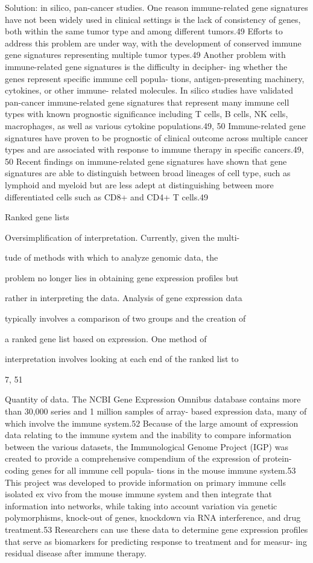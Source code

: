 \documentclass[12pt,]{book}
\theoremstyle{definition}
\theoremstyle{definition}
\theoremstyle{definition}
\theoremstyle{remark}
\begin{document}
Solution: in silico, pan-cancer studies. One reason immune-related gene
signatures have not been widely used in clinical settings is the lack of
consistency of genes, both within the same tumor type and among
different tumors.49 Efforts to address this problem are under way, with
the development of conserved immune gene signatures representing
multiple tumor types.49 Another problem with immune-related gene
signatures is the difficulty in decipher- ing whether the genes
represent specific immune cell popula- tions, antigen-presenting
machinery, cytokines, or other immune- related molecules. In silico
studies have validated pan-cancer immune-related gene signatures that
represent many immune cell types with known prognostic significance
including T cells, B cells, NK cells, macrophages, as well as various
cytokine populations.49, 50 Immune-related gene signatures have proven
to be prognostic of clinical outcome across multiple cancer types and
are associated with response to immune therapy in specific cancers.49,
50 Recent findings on immune-related gene signatures have shown that
gene signatures are able to distinguish between broad lineages of cell
type, such as lymphoid and myeloid but are less adept at distinguishing
between more differentiated cells such as CD8+ and CD4+ T cells.49

Ranked gene lists

Oversimplification of interpretation. Currently, given the multi-

tude of methods with which to analyze genomic data, the

problem no longer lies in obtaining gene expression profiles but

rather in interpreting the data. Analysis of gene expression data

typically involves a comparison of two groups and the creation of

a ranked gene list based on expression. One method of

interpretation involves looking at each end of the ranked list to

7, 51

Quantity of data. The NCBI Gene Expression Omnibus database contains
more than 30,000 series and 1 million samples of array- based expression
data, many of which involve the immune system.52 Because of the large
amount of expression data relating to the immune system and the
inability to compare information between the various datasets, the
Immunological Genome Project (IGP) was created to provide a
comprehensive compendium of the expression of protein-coding genes for
all immune cell popula- tions in the mouse immune system.53 This project
was developed to provide information on primary immune cells isolated ex
vivo from the mouse immune system and then integrate that information
into networks, while taking into account variation via genetic
polymorphisms, knock-out of genes, knockdown via RNA interference, and
drug treatment.53 Researchers can use these data to determine gene
expression profiles that serve as biomarkers for predicting response to
treatment and for measur- ing residual disease after immune therapy.
\end{document}
